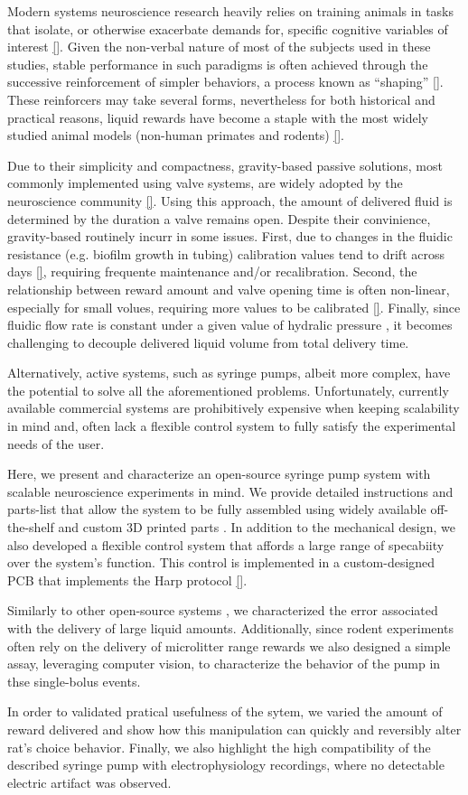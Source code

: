 
Modern systems neuroscience research heavily relies on training animals in tasks that isolate, or otherwise exacerbate demands for, specific cognitive variables of interest \ref{}. Given the non-verbal nature of most of the subjects used in these studies, stable performance in such paradigms is often achieved through the successive reinforcement of simpler behaviors, a process known as “shaping” \ref{}. These reinforcers may take several forms, nevertheless for both historical and practical reasons, liquid rewards have become a staple with the most widely studied animal models (non-human primates and rodents) \ref{}. 

Due to their simplicity and compactness, gravity-based passive solutions, most commonly implemented using valve systems, are widely adopted by the neuroscience community \ref{}. Using this approach, the amount of delivered fluid is determined by the duration a valve remains open. Despite their convinience, gravity-based routinely incurr in some issues. First, due to changes in the fluidic resistance (e.g. biofilm growth in tubing) calibration values tend to drift across days \ref{}, requiring frequente maintenance and/or recalibration. Second, the relationship between reward amount and valve opening time is often non-linear, especially for small volues, requiring more values to be calibrated \ref{}. Finally, since fluidic flow rate is constant under a given value of hydralic pressure \cite{}, it becomes challenging to decouple delivered liquid volume from total delivery time.

Alternatively, active systems, such as syringe pumps, albeit more complex, have the potential to solve all the aforementioned problems. Unfortunately, currently available commercial systems are prohibitively expensive when keeping scalability in mind and, often lack a flexible control system to fully satisfy the experimental needs of the user.

Here, we present and characterize an open-source syringe pump system with scalable neuroscience experiments in mind. We provide detailed instructions and parts-list that allow the system to be fully assembled using widely available off-the-shelf and custom 3D printed parts . 
In addition to the mechanical design, we also developed a flexible control system that affords a large range of specabiity over the system's function. This control is implemented in a custom-designed PCB that implements the Harp protocol \ref{}.

Similarly to other open-source systems \cite{}, we characterized the error associated with the delivery of large liquid amounts. Additionally, since rodent experiments often rely on the delivery of microlitter range rewards we also designed a simple assay, leveraging computer vision, to characterize the behavior of the pump in thse single-bolus events.

In order to validated pratical usefulness of the sytem, we varied the amount of reward delivered and show how this manipulation can quickly and reversibly alter rat's choice behavior. Finally, we also highlight the high compatibility of the described syringe pump with electrophysiology recordings, where no detectable electric artifact was observed.
